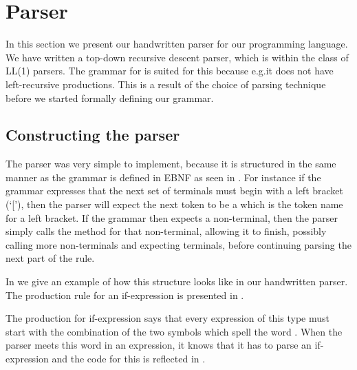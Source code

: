 \section{Parser}

In this section we present our handwritten parser for our programming
language. We have written a top-down recursive descent parser, which
is within the class of LL(1) parsers. The grammar for \productname{}
is suited for this because e.g.\@ it does not have left-recursive
productions. This is a result of the choice of parsing technique before
we started formally defining our grammar.

\subsection{Constructing the parser}
The parser was very simple to implement, because it is structured
in the same manner as the grammar is defined in EBNF as seen in
. For instance if the grammar expresses that the
next set of terminals must begin with a left bracket (`['), then the
parser will expect the next token to be a  which is
the token name for a left bracket. If the grammar then expects a non-terminal, then the parser simply calls the method for that non-terminal, allowing it to finish, possibly calling more non-terminals and expecting terminals, before continuing parsing the next part of the rule.

In  we give an example of how this structure looks like in
our handwritten parser. The production rule for an if-expression is presented in
.


The production for if-expression says that every expression of this type
must start with the combination of the two symbols which spell the word
. When the parser meets this word in an expression, it knows
that it has to parse an if-expression and the code for this is reflected
in .



